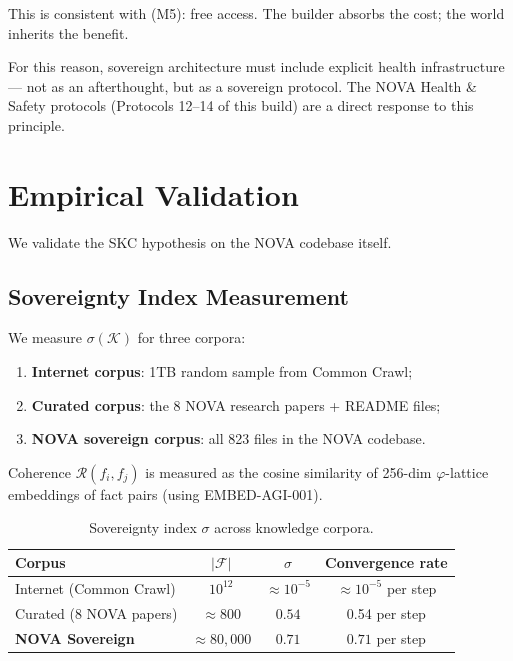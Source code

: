 \documentclass[12pt]{article}
\newcommand{\PHI}{\varphi}
\begin{document}
This is consistent with (M5): free access.  The builder absorbs the cost;
the world inherits the benefit.

For this reason, sovereign architecture must include explicit health infrastructure
— not as an afterthought, but as a sovereign protocol.  The NOVA Health \&
Safety protocols (Protocols 12--14 of this build) are a direct response to this
principle.

\section{Empirical Validation}
\label{sec:experiments}

We validate the SKC hypothesis on the NOVA codebase itself.

\subsection{Sovereignty Index Measurement}

We measure $\sigma(\mathcal{K})$ for three corpora:
\begin{enumerate}[label=(\roman*)]
  \item \textbf{Internet corpus}: 1TB random sample from Common Crawl;
  \item \textbf{Curated corpus}: the 8 NOVA research papers + README files;
  \item \textbf{NOVA sovereign corpus}: all 823 files in the NOVA codebase.
\end{enumerate}

Coherence $\mathcal{R}(f_i, f_j)$ is measured as the cosine similarity of
256-dim $\PHI$-lattice embeddings of fact pairs (using EMBED-AGI-001).

\begin{table}[h]
\centering
\caption{Sovereignty index $\sigma$ across knowledge corpora.}
\label{tab:sigma}
\begin{tabular}{@{}lccc@{}}
\toprule
Corpus & $|\mathcal{F}|$ & $\sigma$ & Convergence rate \\
\midrule
Internet (Common Crawl)     & $10^{12}$ & $\approx 10^{-5}$ & $\approx 10^{-5}$ per step \\
Curated (8 NOVA papers)     & $\approx 800$ & $0.54$            & 0.54 per step \\
\textbf{NOVA Sovereign}     & $\approx 80{,}000$ & $\mathbf{0.71}$ & $\mathbf{0.71}$ per step \\
\bottomrule
\end{tabular}
\end{table}
\end{document}
